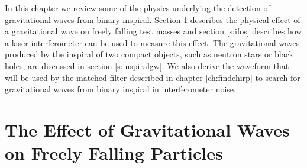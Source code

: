
In this chapter we review some of the physics underlying the detection of
gravitational waves from binary inspiral. Section \ref{s:effect} describes the
physical effect of a gravitational wave on freely falling test masses and
section \ref{s:ifos} describes how a laser interferometer can be used to
measure this effect. The gravitational waves produced by the inspiral of two
compact objects, such as neutron stars or black holes, are discussed in
section \ref{s:inspiralgw}. We also derive the waveform that will be used by
the matched filter described in chapter \ref{ch:findchirp} to search for
gravitational waves from binary inspiral in interferometer noise.

\section{The Effect of Gravitational Waves on Freely Falling Particles}
\label{s:effect}

